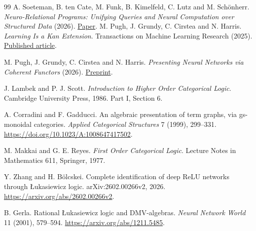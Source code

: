 \documentclass[11pt,a4paper]{article}
\theoremstyle{definition}
\theoremstyle{remark}\newaliascnt{remark}{theorem}
\numberwithin{equation}{section}
\begin{document}
\begin{thebibliography}{99}
 A. Soeteman, B. ten Cate, M. Funk, B. Kimelfeld, C. Lutz and M. Sch\"onherr. \emph{Neuro-Relational Programs: Unifying Queries and Neural Computation over Structured Data} (2026). \href{https://arxiv.org/abs/2606.11946}{Paper}.
 M. Pugh, J. Grundy, C. Cirstea and N. Harris. \emph{Learning Is a Kan Extension}. Transactions on Machine Learning Research (2025). \href{https://openreview.net/forum?id=xWKtKdeefL}{Published article}.

 M. Pugh, J. Grundy, C. Cirstea and N. Harris. \emph{Presenting Neural Networks via Coherent Functors} (2026). \href{https://arxiv.org/abs/2604.15100}{Preprint}.

 J. Lambek and P. J. Scott. \emph{Introduction to Higher Order Categorical Logic}. Cambridge University Press, 1986. Part I, Section 6.

 A. Corradini and F. Gadducci. An algebraic presentation of term graphs, via gs-monoidal categories. \emph{Applied Categorical Structures} 7 (1999), 299--331. \url{https://doi.org/10.1023/A:1008647417502}.

 M. Makkai and G. E. Reyes. \emph{First Order Categorical Logic}. Lecture Notes in Mathematics 611, Springer, 1977.

 Y. Zhang and H. B\"olcskei. Complete identification of deep ReLU networks through \L{}ukasiewicz logic. arXiv:2602.00266v2, 2026. \url{https://arxiv.org/abs/2602.00266v2}.

 B. Gerla. Rational \L{}ukasiewicz logic and DMV-algebras. \emph{Neural Network World} 11 (2001), 579--594. \url{https://arxiv.org/abs/1211.5485}.


\end{thebibliography}
\end{document}
